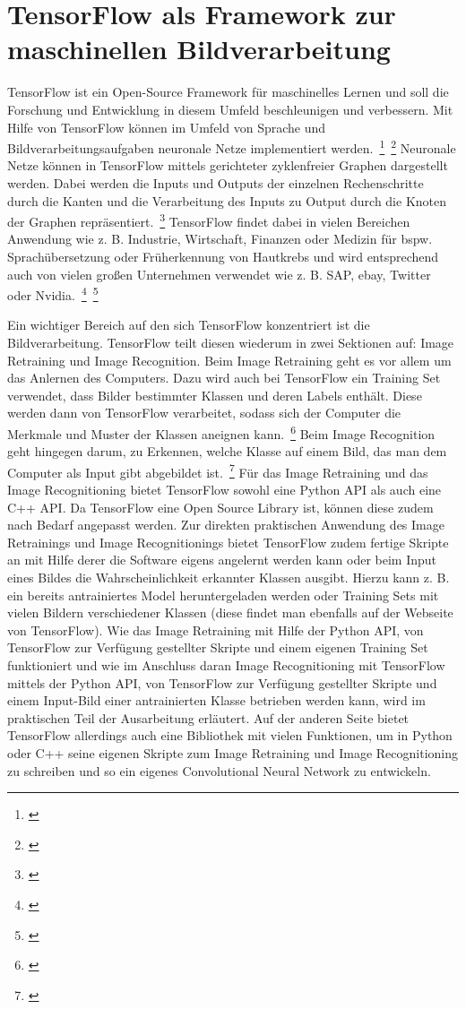 \section{TensorFlow als Framework zur maschinellen Bildverarbeitung}
TensorFlow ist ein Open-Source Framework für maschinelles Lernen und soll die Forschung und Entwicklung in diesem Umfeld beschleunigen und verbessern. Mit Hilfe von TensorFlow können im Umfeld von Sprache und Bildverarbeitungsaufgaben neuronale Netze implementiert werden.~\footnote{\cite{OttoGeiler.2018}}~\footnote{\cite{TensorFlow.2018}} Neuronale Netze können in TensorFlow mittels gerichteter zyklenfreier Graphen dargestellt werden. Dabei werden die Inputs und Outputs der einzelnen Rechenschritte durch die Kanten und die Verarbeitung des Inputs zu Output durch die Knoten der Graphen repräsentiert.~\footnote{\cite{OttoGeiler.2018}} TensorFlow findet dabei in vielen Bereichen Anwendung wie z. B. Industrie, Wirtschaft, Finanzen oder Medizin für bspw. Sprachübersetzung oder Früherkennung von Hautkrebs und wird entsprechend auch von vielen großen Unternehmen verwendet wie z. B. SAP, ebay, Twitter oder Nvidia.~\footnote{\cite{TensorFlow.2018}}~\footnote{\cite{OttoGeiler.2018}}

Ein wichtiger Bereich auf den sich TensorFlow konzentriert ist die Bildverarbeitung. TensorFlow teilt diesen wiederum in zwei Sektionen auf: Image Retraining und Image Recognition. Beim Image Retraining geht es vor allem um das Anlernen des Computers. Dazu wird auch bei TensorFlow ein Training Set verwendet, dass Bilder bestimmter Klassen und deren Labels enthält. Diese werden dann von TensorFlow verarbeitet, sodass sich der Computer die Merkmale und Muster der Klassen aneignen kann.~\footnote{\cite{TensorFlow.2017}} Beim Image Recognition geht hingegen darum, zu Erkennen, welche Klasse auf einem Bild, das man dem Computer als Input gibt abgebildet ist.~\footnote{\cite{Tensorflow}} Für das Image Retraining und das Image Recognitioning bietet TensorFlow sowohl eine Python API als auch eine C++ API. Da TensorFlow eine Open Source Library ist, können diese zudem nach Bedarf angepasst werden. Zur direkten praktischen Anwendung des Image Retrainings und Image Recognitionings bietet TensorFlow zudem fertige Skripte an mit Hilfe derer die Software eigens angelernt werden kann oder beim Input eines Bildes die Wahrscheinlichkeit erkannter Klassen ausgibt. Hierzu kann z. B. ein bereits antrainiertes Model heruntergeladen werden oder Training Sets mit vielen Bildern verschiedener Klassen (diese findet man ebenfalls auf der Webseite von TensorFlow). Wie das Image Retraining mit Hilfe der Python API, von TensorFlow zur Verfügung gestellter Skripte und einem eigenen Training Set funktioniert und wie im Anschluss daran Image Recognitioning mit TensorFlow mittels der Python API, von TensorFlow zur Verfügung gestellter Skripte und einem Input-Bild einer antrainierten Klasse betrieben werden kann, wird im praktischen Teil der Ausarbeitung erläutert. Auf der anderen Seite bietet TensorFlow allerdings auch eine Bibliothek mit vielen Funktionen, um in Python oder C++ seine eigenen Skripte zum Image Retraining und Image Recognitioning zu schreiben und so ein eigenes Convolutional Neural Network zu entwickeln.

